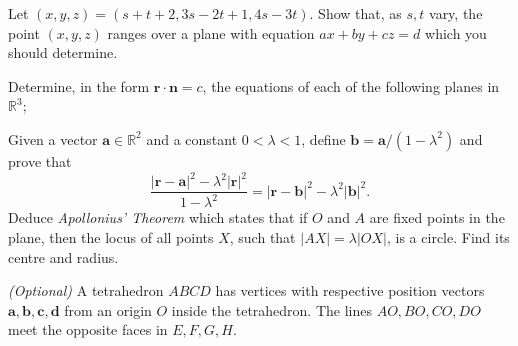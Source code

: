 \documentclass[answers]{exam}
\begin{document}
\begin{questions}
\question%
Let $(x, y, z)=(s+t+2,3 s-2 t+1,4 s-3 t)$. Show that, as $s, t$ vary, the point $(x, y, z)$ ranges over a plane with equation $a x+b y+c z=d$ which you should determine.



\question%
Determine, in the form $\mathbf{r} \cdot \mathbf{n}=c$, the equations of each of the following planes in $\mathbb{R}^{3}$;

\question%
Given a vector $\mathbf{a} \in \mathbb{R}^{2}$ and a constant $0<\lambda<1$, define $\mathbf{b}=\mathbf{a} /(1-\lambda^{2})$ and prove that \[
	\frac{|\mathbf{r}-\mathbf{a}|^{2}-\lambda^{2}|\mathbf{r}|^{2}}{1-\lambda^{2}}=|\mathbf{r}-\mathbf{b}|^{2}-\lambda^{2}|\mathbf{b}|^{2}.
\] Deduce \emph{Apollonius' Theorem} which states that if $O$ and $A$ are fixed points in the plane, then the locus of all points $X$, such that $|A X|=\lambda|OX|$, is a circle. Find its centre and radius.



\question%
\emph{(Optional)} A tetrahedron $A B C D$ has vertices with respective position vectors $\mathbf{a}, \mathbf{b}, \mathbf{c}, \mathbf{d}$ from an origin $O$ inside the tetrahedron. The lines $A O, B O, C O, D O$ meet the opposite faces in $E, F, G, H$.
\end{questions}
\end{document}
